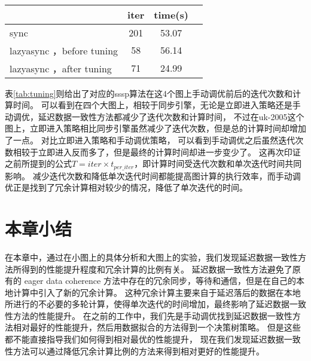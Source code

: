 \begin{table}[!htbp]
\begin{subtable}[t]{0.45\textwidth}
  \end{subtable}
  ~%
  \begin{subtable}[t]{0.45\textwidth}
      \centering
      \label{tab:sample_4}
      \begin{tabular}{lccc}
          \hline
          & iter  & time(s) \\
          \hline
          sync & 201 & 53.07 \\
          \hline
          lazyasync ，before tuning & 58 & 56.14 \\
          \hline
          lazyasync ，after tuning & 71 & 24.99 \\
          \hline
      \end{tabular}
  \end{subtable}
\end{table}
表\ref{tab:tuning}则给出了对应的sssp算法在这4个图上手动调优前后的迭代次数和计算时间。
可以看到在四个大图上，相较于同步引擎，无论是立即进入策略还是手动调优，延迟数据一致性方法都减少了迭代次数和计算时间，
不过在uk-2005这个图上，立即进入策略相比同步引擎虽然减少了迭代次数，但是总的计算时间却增加了一点。
对比立即进入策略和手动调优策略， 可以看到手动调优之后虽然迭代次数相较于立即进入反而多了，但是最终的计算时间却进一步变少了。
这再次印证之前所提到的公式$T=iter \times t_{per\_iter}$，即计算时间受迭代次数和单次迭代时间共同影响。
减少迭代次数和降低单次迭代时间都能提高图计算的执行效率，而手动调优正是找到了冗余计算相对较少的情况，降低了单次迭代的时间。



\section{本章小结}
在本章中，通过在小图上的具体分析和大图上的实验，我们发现延迟数据一致性方法所得到的性能提升程度和冗余计算的比例有关。
延迟数据一致性方法避免了原有的 eager data coherence 方法中存在的冗余同步，等待和通信，但是在自己的本地计算中引入了新的冗余计算。
这种冗余计算主要来自于延迟落后的数据在本地所进行的不必要的多轮计算，使得单次迭代的时间增加，最终影响了延迟数据一致性方法的性能提升。
在之前的工作中，我们先是手动调优找到延迟数据一致性方法相对最好的性能提升，然后用数据拟合的方法得到一个决策树策略。
但是这些都不能直接指导我们如何得到相对最优的性能提升，
现在我们发现延迟数据一致性方法可以通过降低冗余计算比例的方法来得到相对更好的性能提升。
